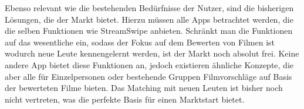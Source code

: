 \noindent
Ebenso relevant wie die bestehenden Bedürfnisse der Nutzer, sind die bisherigen Lösungen, die der Markt bietet. Hierzu müssen alle Apps betrachtet werden, die die selben Funktionen wie StreamSwipe anbieten. Schränkt man die Funktionen auf das wesentliche ein, sodass der Fokus auf dem Bewerten von Filmen ist wodurch neue Leute kennengelernt werden, ist der Markt noch absolut frei. Keine andere App bietet diese Funktionen an, jedoch existieren ähnliche Konzepte, die aber alle für Einzelpersonen oder bestehende Gruppen Filmvorschläge auf Basis der bewerteten Filme bieten. Das Matching mit neuen Leuten ist bisher noch nicht vertreten, was die perfekte Basis für einen Marktstart bietet.